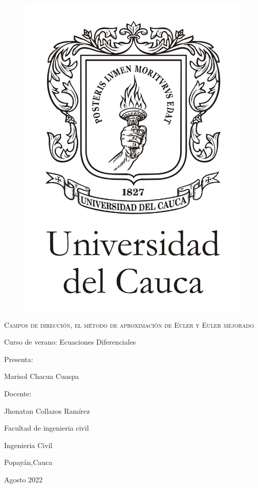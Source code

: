\documentclass[12 pt,letterpaper]{article}
\author{Marisol Chacua Cuaspa}
\begin{document}
	
	
	\begin{titlepage}
		\centering
		
		\vspace{0.5cm}
		\begin{figure}[h]
   		\centering
		\includegraphics[scale=0.5]{LOGO UNICAUCA}
		\end{figure}
		{\scshape\LARGE Campos de direcci\'on, el m\'etodo de aproximaci\'on de Euler y Euler mejorado\par}
		\vspace{3cm}
		{\Large Curso de verano: Ecuaciones Diferenciales\par}
		\vfill
		{\Large Presenta: \par}
		{\Large Marisol Chacua Cuaspa \par}
		\vfill
		{\Large Docente: \par}
		{\Large Jhonatan Collazos Ramírez \par}
		\vfill
        {\Large Facultad de ingenieria civil\par}
        {\Large Ingenieria Civil\par}
		{\Large Popayán,Cauca\par}
	    {\Large Agosto 2022\par}
	\end{titlepage}
	
\end{document}
